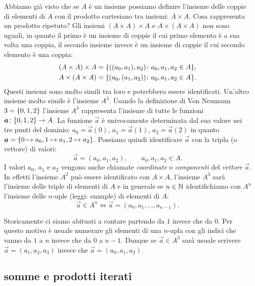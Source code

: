 Abbiamo già visto che se $A$ è un insieme possiamo definire l'insieme 
delle coppie di elementi di $A$ con il prodotto cartesiano tra insiemi: 
$A\times A$. 
Cosa rappresenta un prodotto ripetuto?
Gli insiemi $(A\times A)\times A$ e $A\times(A\times A)$ non sono 
uguali, in quanto il primo è un insieme di coppie il cui primo elemento 
è a sua volta una coppia, il secondo insieme invece è un insieme di coppie 
il cui secondo elemento è una coppia:
\begin{gather*}
  (A\times A)\times A = {\left\{ ((a_0,a_1),a_2)\colon a_0,a_1,a_2\in A \right\}},
  \\
  A \times (A\times A) = {\left\{ (a_0,(a_1,a_2))\colon a_0,a_1,a_2\in A \right\}}.
\end{gather*}
Questi insiemi sono molto simili tra loro e potrebbero essere identificati.
Un'altro insieme molto simile è l'insieme $A^{3}$.  
Usando la definizione di Von Neumann $3 = {\left\{ 0,1,2 \right\}}$ l'insieme 
$A^{3}$ rappresenta l'insieme di tutte le funzioni 
$\boldsymbol a\colon {\left\{ 0,1,2 \right\}}\to A$.
La funzione $\vec a$ è univocamente determinata dal suo valore nei 
tre punti del dominio: $a_0 = \vec a(0)$, $a_1=\vec a(1)$, $a_2=\vec a(2)$
in quanto $\boldsymbol a = {\left\{ 0\mapsto a_0, 1\mapsto a_1, 2\mapsto a_2 \right\}}$.
Possiamo quindi identificare $\vec a$ con la tripla (o vettore) di valori:
\[
  \vec a = (a_0, a_1, a_2), \qquad a_0,a_1,a_2 \in A.  
\]
I valori $a_0$, $a_1$ e $a_2$ vengono anche chiamate \emph{coordinate}
o \emph{componenti} del \emph{vettore} $\vec a$.
%
%
%
%
%
In effetti l'insieme $A^{2}$ può essere identificato con $A\times A$, l'insieme 
$A^{3}$ sarà l'insieme delle triple di elementi di $A$ e in generale se $n\in{\mathbb N}$ 
identifichiamo con $A^{n}$ l'insieme delle $n$-uple (leggi: ennuple) di elementi 
%
di $A$:%
%
\[
   \vec a \in A^{n} \iff 
   \vec a = (a_0, a_1, \dots, a_{n-1}).  
\]

Storicamente ci siamo abituati a contare partendo da $1$ invece che da $0$.
Per questo motivo è usuale numerare gli elementi di una $n$-upla con gli indici 
che vanno da $1$ a $n$ invece che da $0$ a $n-1$.
Dunque se $\vec a \in A^{3}$ sarà usuale scrivere 
$\vec a = (a_1, a_2, a_3)$ invece che $\vec a = (a_0, a_1, a_2)$.

\subsection{somme e prodotti iterati}
%
%

